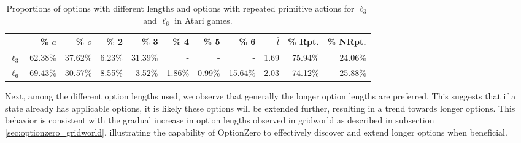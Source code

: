 \begin{table}[h!]
    \caption{Proportions of options with different lengths and options with repeated primitive actions for $\ell_3$ and $\ell_6$ in Atari games.}
    \centering
    \small
    \begin{tabular}{l|rr|rrrrr|r|rr}
        \toprule
        & \% $a$ & \% $o$ & \% 2 & \% 3 & \% 4 & \% 5 & \% 6 & $\bar{l}$ & \% Rpt. & \% NRpt. \\
        \midrule
        $\ell_3$ & 62.38\% & 37.62\% & 6.23\% & 31.39\% & - & - & - & 1.69 & 75.94\% & 24.06\% \\
        $\ell_6$ & 69.43\% & 30.57\% & 8.55\% & 3.52\% & 1.86\% & 0.99\% & 15.64\% & 2.03 & 74.12\% & 25.88\% \\
        \bottomrule
    \end{tabular}
    \label{tab:option-length-with-repeat}
\end{table}

Next, among the different option lengths used, we observe that generally the longer option lengths are preferred.
This suggests that if a state already has applicable options, it is likely these options will be extended further, resulting in a trend towards longer options.
This behavior is consistent with the gradual increase in option lengths observed in gridworld as described in subsection \ref{sec:optionzero_gridworld}, illustrating the capability of OptionZero to effectively discover and extend longer options when beneficial.

